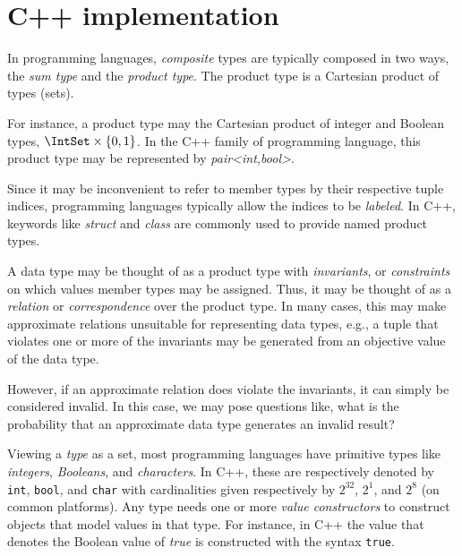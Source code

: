 \documentclass[ ../main.tex]{subfiles}
\begin{document}
\section{C++ implementation}
\label{sec:cpp}



In programming languages, \emph{composite} types are typically composed in two ways, the \emph{sum type} and the \emph{product type}.
The product type is a Cartesian product of types (sets).

For instance, a product type may the Cartesian product of integer and Boolean types, $\IntSet \times \{0,1\}$. In the C++ family of programming language, this product type may be represented by \emph{pair<int,bool>}.

Since it may be inconvenient to refer to member types by their respective tuple indices, programming languages typically allow the indices to be \emph{labeled}. In C++, keywords like \emph{struct} and \emph{class} are commonly used to provide named product types.

A data type may be thought of as a product type with \emph{invariants}, or \emph{constraints} on which values member types may be assigned. Thus, it may be thought of as a \emph{relation} or \emph{correspondence} over the product type. In many cases, this may make approximate relations unsuitable for representing data types, e.g., a tuple that violates one or more of the invariants may be generated from an objective value of the data type.

However, if an approximate relation does violate the invariants, it can simply be considered invalid. In this case, we may pose questions like, what is the probability that an approximate data type generates an invalid result?

Viewing a \emph{type} as a set, most programming languages have primitive types like \emph{integers}, \emph{Booleans}, and \emph{characters}.
In C++, these are respectively denoted by \texttt{int}, \texttt{bool}, and \texttt{char} with cardinalities given respectively by $2^{32}$, $2^1$, and $2^8$ (on common platforms).
Any type needs one or more \emph{value constructors} to construct objects that model values in that type.
For instance, in C++ the value that denotes the Boolean value of \emph{true} is constructed with the syntax \texttt{true}.
\end{document}
